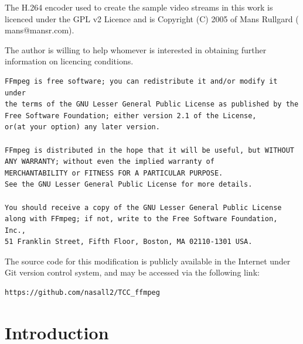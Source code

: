 \documentclass[
	12pt,				%
	openright,			%
	twoside,			%
	a4paper,			%
	brazil,
	french,				%
	english
	]{abntex2}
\begin{document}
The H.264 encoder used to create the sample video streams in this work is licenced under the GPL v2 Licence and is Copyright (C) 2005 of Mans Rullgard ( mans@mansr.com).

The author is willing to help whomever is interested in obtaining further information on licencing conditions.

\begin{minipage}{\linewidth}
\begin{lstlisting}[]
FFmpeg is free software; you can redistribute it and/or modify it under
the terms of the GNU Lesser General Public License as published by the
Free Software Foundation; either version 2.1 of the License,
or(at your option) any later version.

FFmpeg is distributed in the hope that it will be useful, but WITHOUT
ANY WARRANTY; without even the implied warranty of
MERCHANTABILITY or FITNESS FOR A PARTICULAR PURPOSE.
See the GNU Lesser General Public License for more details.

You should receive a copy of the GNU Lesser General Public License
along with FFmpeg; if not, write to the Free Software Foundation, Inc.,
51 Franklin Street, Fifth Floor, Boston, MA 02110-1301 USA.
\end{lstlisting}
\end{minipage}

The source code for this modification is publicly available in the Internet under Git version control system, and may be accessed via the following link:
\begin{verbatim}
https://github.com/nasall2/TCC_ffmpeg
\end{verbatim}
 
\chapter[Introduction]{Introduction}

\end{document}
